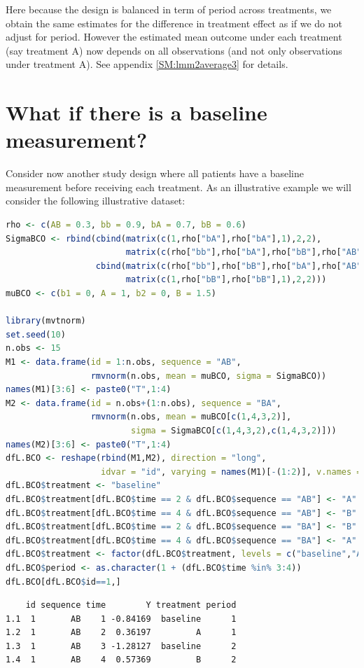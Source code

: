 \documentclass[12pt]{article}
\begin{document}
Here because the design is balanced in term of period across
treatments, we obtain the same estimates for the difference in
treatment effect as if we do not adjust for period. However the
estimated mean outcome under each treatment (say treatment A) now
depends on all observations (and not only observations under treatment
A). See appendix \ref{SM:lmm2average3} for details.

\clearpage
\section{What if there is a baseline measurement?}
\label{sec:org53e67f9}

Consider now another study design where all patients have a baseline
measurement before receiving each treatment. As an illustrative
example we will consider the following illustrative dataset:
\begin{lstlisting}[language=r,numbers=none]
rho <- c(AB = 0.3, bb = 0.9, bA = 0.7, bB = 0.6)
SigmaBCO <- rbind(cbind(matrix(c(1,rho["bA"],rho["bA"],1),2,2),
                        matrix(c(rho["bb"],rho["bA"],rho["bB"],rho["AB"]),2,2)),
                  cbind(matrix(c(rho["bb"],rho["bB"],rho["bA"],rho["AB"]),2,2),
                        matrix(c(1,rho["bB"],rho["bB"],1),2,2)))
muBCO <- c(b1 = 0, A = 1, b2 = 0, B = 1.5)

library(mvtnorm)
set.seed(10)
n.obs <- 15
M1 <- data.frame(id = 1:n.obs, sequence = "AB",
                 rmvnorm(n.obs, mean = muBCO, sigma = SigmaBCO))
names(M1)[3:6] <- paste0("T",1:4)
M2 <- data.frame(id = n.obs+(1:n.obs), sequence = "BA",
                 rmvnorm(n.obs, mean = muBCO[c(1,4,3,2)],
                         sigma = SigmaBCO[c(1,4,3,2),c(1,4,3,2)]))
names(M2)[3:6] <- paste0("T",1:4)
dfL.BCO <- reshape(rbind(M1,M2), direction = "long",
                   idvar = "id", varying = names(M1)[-(1:2)], v.names = c("Y"), times = 1:4)
dfL.BCO$treatment <- "baseline"
dfL.BCO$treatment[dfL.BCO$time == 2 & dfL.BCO$sequence == "AB"] <- "A"
dfL.BCO$treatment[dfL.BCO$time == 4 & dfL.BCO$sequence == "AB"] <- "B"
dfL.BCO$treatment[dfL.BCO$time == 2 & dfL.BCO$sequence == "BA"] <- "B"
dfL.BCO$treatment[dfL.BCO$time == 4 & dfL.BCO$sequence == "BA"] <- "A"
dfL.BCO$treatment <- factor(dfL.BCO$treatment, levels = c("baseline","A","B"))
dfL.BCO$period <- as.character(1 + (dfL.BCO$time %in% 3:4))
dfL.BCO[dfL.BCO$id==1,]
\end{lstlisting}

\label{}
\begin{verbatim}
    id sequence time        Y treatment period
1.1  1       AB    1 -0.84169  baseline      1
1.2  1       AB    2  0.36197         A      1
1.3  1       AB    3 -1.28127  baseline      2
1.4  1       AB    4  0.57369         B      2
\end{verbatim}
\end{document}

